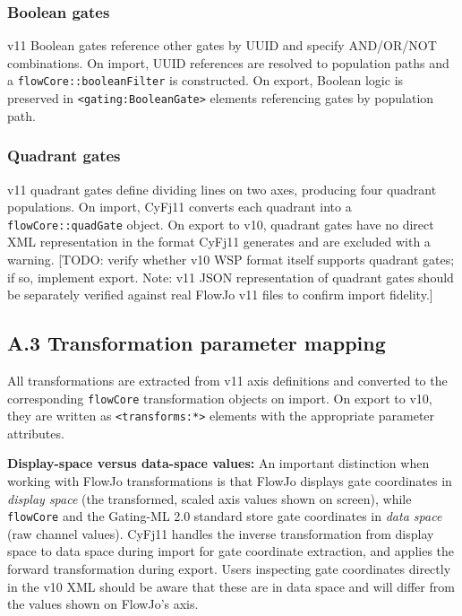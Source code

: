 \documentclass[
]{article}
\begin{document}
\subsubsection{Boolean gates}\label{boolean-gates}

v11 Boolean gates reference other gates by UUID and specify AND/OR/NOT
combinations. On import, UUID references are resolved to population
paths and a \texttt{flowCore::booleanFilter} is constructed. On export,
Boolean logic is preserved in
\texttt{\textless{}gating:BooleanGate\textgreater{}} elements
referencing gates by population path.

\subsubsection{Quadrant gates}\label{quadrant-gates}

v11 quadrant gates define dividing lines on two axes, producing four
quadrant populations. On import, CyFj11 converts each quadrant into a
\texttt{flowCore::quadGate} object. On export to v10, quadrant gates
have no direct XML representation in the format CyFj11 generates and are
excluded with a warning.
\textcolor{pending}{[TODO: verify whether v10 WSP format itself supports quadrant gates; if so, implement export. Note: v11 JSON representation of quadrant gates should be separately verified against real FlowJo v11 files to confirm import fidelity.]}

\subsection{A.3 Transformation parameter
mapping}\label{a.3-transformation-parameter-mapping}

All transformations are extracted from v11 axis definitions and
converted to the corresponding \texttt{flowCore} transformation objects
on import. On export to v10, they are written as
\texttt{\textless{}transforms:*\textgreater{}} elements with the
appropriate parameter attributes.

\textbf{Display-space versus data-space values:} An important
distinction when working with FlowJo transformations is that FlowJo
displays gate coordinates in \emph{display space} (the transformed,
scaled axis values shown on screen), while \texttt{flowCore} and the
Gating-ML 2.0 standard store gate coordinates in \emph{data space} (raw
channel values). CyFj11 handles the inverse transformation from display
space to data space during import for gate coordinate extraction, and
applies the forward transformation during export. Users inspecting gate
coordinates directly in the v10 XML should be aware that these are in
data space and will differ from the values shown on FlowJo's axis.
\end{document}
